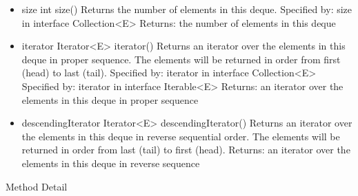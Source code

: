 \documentclass[babel]{book}
\begin{document}
\begin{itemize}
	\item size
	int size()
	Returns the number of elements in this deque.
	Specified by:
	size in interface Collection<E>
	Returns:
	the number of elements in this deque
	
	\item iterator
	Iterator<E> iterator()
	Returns an iterator over the elements in this deque in proper sequence. The elements will be returned in order from first (head) to last (tail).
	Specified by:
	iterator in interface Collection<E>
	Specified by:
	iterator in interface Iterable<E>
	Returns:
	an iterator over the elements in this deque in proper sequence
	
	\item descendingIterator
	Iterator<E> descendingIterator()
	Returns an iterator over the elements in this deque in reverse sequential order. The elements will be returned in order from last (tail) to first (head).
	Returns:
	an iterator over the elements in this deque in reverse sequence
	
\end{itemize}

Method Detail
\end{document}
